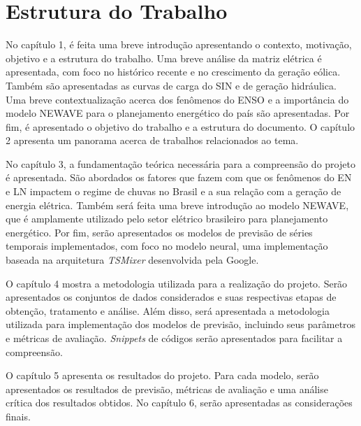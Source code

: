 \section{Estrutura do Trabalho}
No capítulo 1, é feita uma breve introdução apresentando o contexto, motivação, objetivo e a estrutura do trabalho. Uma
breve análise da matriz elétrica é apresentada, com foco no histórico recente e no crescimento da geração eólica. Também
são apresentadas as curvas de carga do SIN e de geração hidráulica. Uma breve contextualização acerca dos fenômenos do
ENSO e a importância do modelo NEWAVE para o planejamento energético do país são apresentadas. Por fim, é apresentado
o objetivo do trabalho e a estrutura do documento. O capítulo 2 apresenta um panorama acerca de trabalhos relacionados ao tema.

No capítulo 3, a fundamentação teórica necessária para a compreensão do projeto é apresentada. São abordados os fatores
que fazem com que os fenômenos do EN e LN impactem o regime de chuvas no Brasil e a sua relação com a geração de 
energia elétrica. Também será feita uma breve introdução ao modelo NEWAVE,
que é amplamente utilizado pelo setor elétrico brasileiro para planejamento energético. Por fim, serão apresentados os modelos 
de previsão de séries temporais implementados, com foco no modelo neural, uma implementação baseada na arquitetura 
\textit{TSMixer} desenvolvida pela Google.

O capítulo 4 mostra a metodologia utilizada para a realização do projeto. Serão apresentados os conjuntos de dados
considerados e suas respectivas etapas de obtenção, tratamento e análise. Além disso, será apresentada a metodologia
utilizada para implementação dos modelos de previsão, incluindo seus parâmetros e métricas de avaliação. \textit{Snippets}
de códigos serão apresentados para facilitar a compreensão.

O capítulo 5 apresenta os resultados do projeto. Para cada modelo, serão apresentados os resultados de previsão, métricas 
de avaliação e uma análise crítica dos resultados obtidos. No capítulo 6, serão apresentadas as considerações finais.




